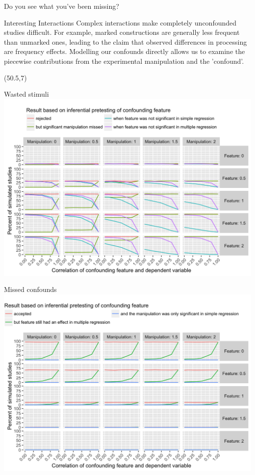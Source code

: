 \documentclass[final]{beamer}
\begin{document}
\begin{frame}{}
\begin{textblock}{48}
\begin{block}{Do you see what you've been missing?}
\end{block}

\begin{block}{Interesting Interactions}
Complex interactions make completely unconfounded studies difficult. 
For example, marked constructions are generally less frequent than unmarked ones, leading to the claim that observed differences in processing are frequency effects.
Modelling our confounds directly allows us to examine the piecewise contributions from the experimental manipulation and the 'confound'.

\vspace{.38cm}
\end{block}

\end{textblock}

\begin{textblock}{48}(50.5,7)

\begin{block}{Wasted stimuli}
\includegraphics{rejections.png}
\end{block}

\begin{block}{Missed confounds}
\includegraphics{acceptances.png}
\end{block}


\end{textblock}
\end{frame}
\end{document}
